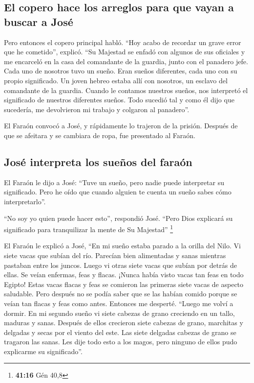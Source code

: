\hypertarget{el-copero-hace-los-arreglos-para-que-vayan-a-buscar-a-josuxe9}{%
\subsection{El copero hace los arreglos para que vayan a buscar a
José}\label{el-copero-hace-los-arreglos-para-que-vayan-a-buscar-a-josuxe9}}

 Pero entonces el copero principal habló. ``Hoy acabo de
recordar un grave error que he cometido'', explicó.  ``Su
Majestad se enfadó con algunos de sus oficiales y me encarceló en la
casa del comandante de la guardia, junto con el panadero jefe.
 Cada uno de nosotros tuvo un sueño. Eran sueños
diferentes, cada uno con su propio significado.  Un joven
hebreo estaba allí con nosotros, un esclavo del comandante de la
guardia. Cuando le contamos nuestros sueños, nos interpretó el
significado de nuestros diferentes sueños.  Todo sucedió
tal y como él dijo que sucedería, me devolvieron mi trabajo y colgaron
al panadero''.

 El Faraón convocó a José, y rápidamente lo trajeron de
la prisión. Después de que se afeitara y se cambiara de ropa, fue
presentado al Faraón.

\hypertarget{josuxe9-interpreta-los-sueuxf1os-del-farauxf3n}{%
\subsection{José interpreta los sueños del
faraón}\label{josuxe9-interpreta-los-sueuxf1os-del-farauxf3n}}

 El Faraón le dijo a José: ``Tuve un sueño, pero nadie
puede interpretar su significado. Pero he oído que cuando alguien te
cuenta un sueño sabes cómo interpretarlo''.

 ``No soy yo quien puede hacer esto'', respondió José.
``Pero Dios explicará su significado para tranquilizar la mente de Su
Majestad'' \footnote{\textbf{41:16} Gén 40,8}

 El Faraón le explicó a José, ``En mi sueño estaba parado
a la orilla del Nilo.  Vi siete vacas que subían del río.
Parecían bien alimentadas y sanas mientras pastaban entre los juncos.
 Luego vi otras siete vacas que subían por detrás de
ellas. Se veían enfermas, feas y flacas. ¡Nunca había visto vacas tan
feas en todo Egipto!  Estas vacas flacas y feas se
comieron las primeras siete vacas de aspecto saludable. 
Pero después no se podía saber que se las habían comido porque se veían
tan flacas y feas como antes. Entonces me desperté. 
``Luego me volví a dormir. En mi segundo sueño vi siete cabezas de grano
creciendo en un tallo, maduras y sanas.  Después de ellos
crecieron siete cabezas de grano, marchitas y delgadas y secas por el
viento del este.  Las siete delgadas cabezas de grano se
tragaron las sanas. Les dije todo esto a los magos, pero ninguno de
ellos pudo explicarme su significado''.

